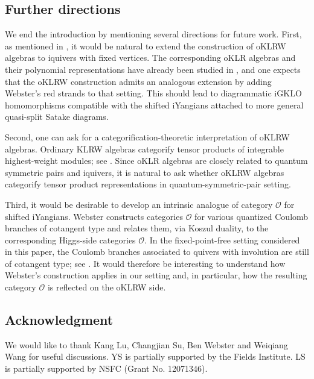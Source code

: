 \documentclass[12pt,openany]{amsart}
\newcommand{\cref}[1]{\zcref{#1}}
\begin{document}
\subsection{Further directions}

We end the introduction by mentioning several directions for future work. First, as mentioned in \cref{rem:extend}, it would be natural to extend the construction of oKLRW algebras to iquivers with fixed vertices.  The corresponding oKLR algebras and their polynomial representations have already been studied in \cite{Prz23}, and one expects that the oKLRW construction admits an analogous extension by adding Webster's red strands to that setting.  This should lead to diagrammatic iGKLO homomorphisms compatible with the shifted iYangians attached to more general quasi-split Satake diagrams.

Second, one can ask for a categorification-theoretic interpretation of oKLRW algebras.  Ordinary KLRW algebras categorify tensor products of integrable highest-weight modules; see \cite{Web17a}.  Since oKLR algebras are closely related to quantum symmetric pairs and iquivers, it is natural to ask whether oKLRW algebras categorify tensor product representations in quantum-symmetric-pair setting. 

Third, it would be desirable to develop an intrinsic analogue of category $\mathcal O$ for shifted iYangians.
Webster \cite{Web16} constructs categories $\mathcal O$ for various quantized Coulomb branches of cotangent type and relates them, via Koszul duality, to the corresponding Higgs-side categories $\mathcal O$.
In the fixed-point-free setting considered in this paper, the Coulomb branches associated to quivers with involution are still of cotangent type; see \cite{SSX25}.
It would therefore be interesting to understand how Webster's construction applies in our setting and, in particular, how the resulting category $\mathcal O$ is reflected on the oKLRW side.

\subsection*{Acknowledgment}
We would like to thank Kang Lu, Changjian Su, Ben Webster and Weiqiang Wang for useful discussions. YS is partially supported by the Fields Institute.  LS is partially supported by NSFC (Grant No. 12071346).

%


%


%




\end{document}
